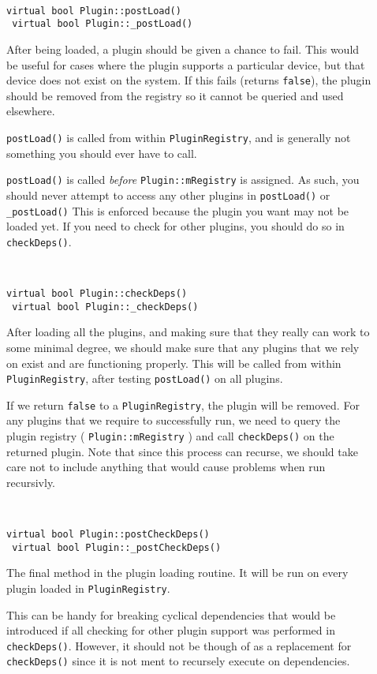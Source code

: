 \begin{description}
\item[] \
\begin{lstlisting}[frame=single]
 virtual bool Plugin::postLoad()	
 virtual bool Plugin::_postLoad()
\end{lstlisting}

After being loaded, a plugin should be given a chance to fail. This 
would be useful for cases where the plugin supports a particular 
device, but that device does not exist on the system. If this
fails (returns {\tt false}), the plugin should be removed from the registry 
so it cannot be queried and used elsewhere.

{\tt postLoad()} is called from within {\tt PluginRegistry}, and is generally 
not something you should ever have to call.

{\tt postLoad()} is called {\em before} {\tt Plugin::mRegistry} is assigned.
As such, you should never attempt to access any other plugins in {\tt postLoad()}
or {\tt \_postLoad()}
This is enforced because the plugin you want may not be loaded yet. If you
need to check for other plugins, you should do so in {\tt checkDeps()}.

\item[] \
\begin{lstlisting}[frame=single]
 virtual bool Plugin::checkDeps()
 virtual bool Plugin::_checkDeps()
\end{lstlisting}

After loading all the plugins, and making sure that they really
can work to some minimal degree, we should make sure that any 
plugins that we rely on exist and are functioning properly.
This will be called from within {\tt PluginRegistry}, after testing
{\tt postLoad()} on all plugins. 

If we return {\tt false} to a 
{\tt PluginRegistry}, the plugin will be removed.
For any plugins that we require to successfully run, we need
to query the plugin registry ( {\tt Plugin::mRegistry} ) and call {\tt checkDeps()}
on the returned plugin. Note that since this process can recurse,
we should take care not to include anything that would cause problems
when run recursivly.

\item [] \ 
\begin{lstlisting}[frame=single]
 virtual bool Plugin::postCheckDeps()
 virtual bool Plugin::_postCheckDeps()
\end{lstlisting}

The final method in the plugin loading routine. It will be run on
every plugin loaded in {\tt PluginRegistry}.


This can be handy for breaking cyclical dependencies that would be
introduced if all checking for other plugin support was performed
in {\tt checkDeps()}. However, it should not be though of as a replacement
for {\tt checkDeps()} since it is not ment to recursely execute on dependencies.

\end{description}

